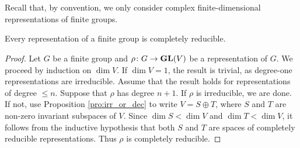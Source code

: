 \chapter{}

Recall that, by convention, we only consider complex 
finite-dimensional representations of finite groups.

\begin{theorem}[Maschke]
    Every representation of a finite group is completely reducible.
\end{theorem}

\begin{proof}
    Let $G$ be a finite group and $\rho\colon G\to\mathbf{GL}(V)$ be a representation of $G$. We proceed
    by induction on $\dim V$.
    If $\dim V=1$, the result is trivial, as degree-one representations are irreducible. Assume that
    the result holds for representations of degree $\leq n$. Suppose that $\rho$ has degree $n+1$. 
    If $\rho$ is irreducible, we are done. If not, use 
    Proposition \ref{pro:irr_or_dec} to 
    write $V=S\oplus T$, where $S$ and $T$
    are non-zero invariant subspaces of $V$. Since $\dim S<\dim V$ and $\dim T<\dim V$, it follows from
    the inductive hypothesis that
    both $S$ and $T$ are spaces of completely reducible representations. 
    Thus $\rho$ is completely reducible.
\end{proof}

